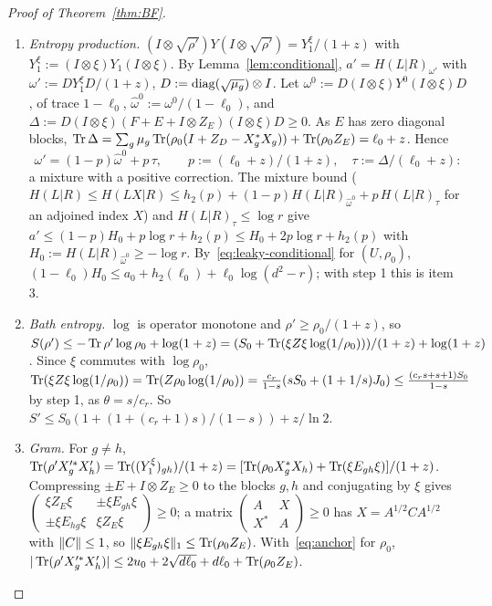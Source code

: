 \begin{proof}[Proof of Theorem~\ref{thm:BF}]
\begin{enumerate}[label=\arabic*.,itemsep=1pt]
$\sum_{g,h}\Tr(\rho'X'^*_hX'_g)A_g(\cdot)A_h^*$, hence leakage $0$, bath entropy $S':=S(\rho')$, and bath map with the spectrum of $\sum_g\mu_gX'_g\rho'X'^*_g$.
\item \emph{Entropy production.} $(I\otimes\sqrt{\rho'})Y(I\otimes\sqrt{\rho'})=Y_1^\xi/(1+z)$ with $Y_1^\xi:=(I\otimes\xi)Y_1(I\otimes\xi)$. By Lemma~\ref{lem:conditional}, $a'=H(L|R)_{\omega'}$ with
$\omega':=DY_1^\xi D/(1+z)$, $D:=\operatorname{diag}(\sqrt{\mu_g})\otimes I$. Let $\omega^0:=D(I\otimes\xi)Y^0(I\otimes\xi)D$, of trace $1-\ell_0$, $\hat\omega^0:=\omega^0/(1-\ell_0)$, and
$\Delta:=D(I\otimes\xi)(F+E+I\otimes Z_E)(I\otimes\xi)D\ge0$. As $E$ has zero diagonal blocks, $\operatorname{Tr}\Delta=\sum_g\mu_g\operatorname{Tr}(\rho_0(I+Z_D-X_g^*X_g))+\operatorname{Tr}(\rho_0Z_E)=\ell_0+z$. Hence
\[
\omega'=(1-p)\hat\omega^0+p\,\tau,\qquad p:=(\ell_0+z)/(1+z),\quad\tau:=\Delta/(\ell_0+z):
\]
a mixture with a positive correction. The mixture bound ($H(L|R)\le H(LX|R)\le h_2(p)+(1-p)H(L|R)_{\hat\omega^0}+p\,H(L|R)_\tau$ for an adjoined index $X$) and $H(L|R)_\tau\le\log r$ give
$a'\le(1-p)H_0+p\log r+h_2(p)\le H_0+2p\log r+h_2(p)$ with $H_0:=H(L|R)_{\hat\omega^0}\ge-\log r$. By~\eqref{eq:leaky-conditional} for $(U,\rho_0)$,
$(1-\ell_0)H_0\le a_0+h_2(\ell_0)+\ell_0\log(d^2-r)$; with step 1 this is item 3.
\item \emph{Bath entropy.} $\log$ is operator monotone and $\rho'\ge\rho_0/(1+z)$, so $S(\rho')\le-\operatorname{Tr}\rho'\log\rho_0+\log(1+z)=(S_0+\operatorname{Tr}(\xi Z\xi\log(1/\rho_0)))/(1+z)+\log(1+z)$. Since $\xi$
commutes with $\log\rho_0$, $\operatorname{Tr}(\xi Z\xi\log(1/\rho_0))=\operatorname{Tr}(Z\rho_0\log(1/\rho_0))=\frac{c_r}{1-s}(sS_0+(1+1/s)J_0)\le\frac{(c_rs+s+1)S_0}{1-s}$ by step 1, as $\theta=s/c_r$. So
$S'\le S_0(1+(1+(c_r+1)s)/(1-s))+z/\ln2$.
\item \emph{Gram.} For $g\ne h$, $\operatorname{Tr}(\rho'X'^*_gX'_h)=\operatorname{Tr}((Y_1^\xi)_{gh})/(1+z)=[\operatorname{Tr}(\rho_0X_g^*X_h)+\operatorname{Tr}(\xi E_{gh}\xi)]/(1+z)$. Compressing $\pm E+I\otimes Z_E\ge0$ to the blocks $g,h$ and
conjugating by $\xi$ gives $\left(\begin{smallmatrix}\xi Z_E\xi&\pm\xi E_{gh}\xi\\\pm\xi E_{hg}\xi&\xi Z_E\xi\end{smallmatrix}\right)\ge0$; a matrix
$\left(\begin{smallmatrix}A&X\\X^*&A\end{smallmatrix}\right)\ge0$ has $X=A^{1/2}CA^{1/2}$ with $\lVert C\rVert\le1$, so $\lVert \xi E_{gh}\xi\rVert_1\le\operatorname{Tr}(\rho_0Z_E)$. With~\eqref{eq:anchor} for $\rho_0$,
$|\operatorname{Tr}(\rho'X'^*_gX'_h)|\le2u_0+2\sqrt{d\ell_0}+d\ell_0+\operatorname{Tr}(\rho_0Z_E)$.

\end{enumerate}
\end{proof}
